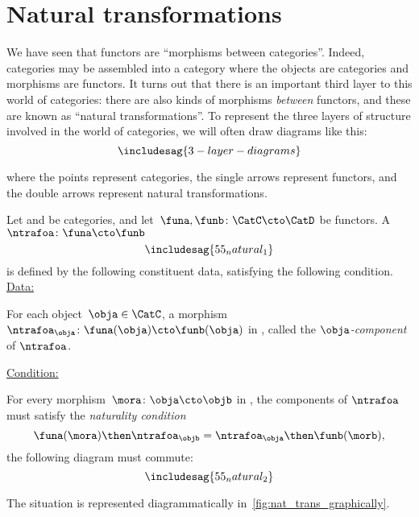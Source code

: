 

\section{Natural transformations}

We have seen that functors are ``morphisms between categories''. Indeed, categories may be assembled into a category \index{\Category} where the objects are categories and morphisms are functors. It turns out that there is an important third layer to this world of categories: there are also kinds of morphisms \emph{between} functors, and these are known as ``natural transformations''. To represent the three layers of structure involved in the world of categories, we will often draw diagrams like this:
\begin{equation}
  \includesag{3-layer-diagrams}
\end{equation}

where the points represent categories, the single arrows represent functors, and the double arrows represent natural transformations.


\begin{ctdefinition}
  \label{def:natural-transformation}
  Let \CatC and \CatD be categories, and let~$\funa,\funb\colon \CatC\cto \CatD$ be functors. A \emph{}~$\ntrafoa \colon \funa\cto \funb$
  \begin{equation}
    \includesag{55_natural_1}
  \end{equation}
  is defined by the following constituent data, satisfying the following condition.
  \underline{Data:}
  \begin{compactenum}
    \item For each object~$\obja\in \CatC$, a morphism $\ntrafoa_\obja \colon \funa(\obja)\cto \funb(\obja)$ in \CatD, called the $\obja$\emph{-component} of $\ntrafoa$.
  \end{compactenum}
  \underline{Condition:}
  \begin{compactenum}
    \item For every morphism~$\mora\colon \obja\cto \objb$ in \CatC, the components of $\ntrafoa$ must satisfy the \emph{naturality condition}
    \begin{equation}
      \funa(\mora)\then \ntrafoa_\objb = \ntrafoa_\obja\then \funb(\morb),
    \end{equation}
    \ie  the following diagram must commute:
    \begin{equation}
      \includesag{55_natural_2}
    \end{equation}
  \end{compactenum}
  The situation is represented diagrammatically in~\cref{fig:nat_trans_graphically}.
\end{ctdefinition}

